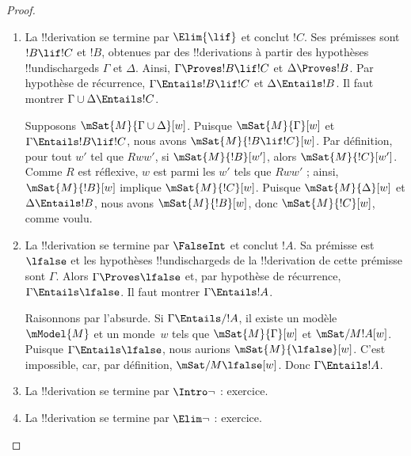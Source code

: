 \documentclass[../../../include/open-logic-section]{subfiles}
\begin{document}
\begin{proof}
\begin{enumerate}
    Supposons $\mSat{M}{\Gamma}[w]$. Nous voulons montrer que,
    pour tout $w'$ tel que $Rww'$, si $\mSat{M}{!B}[w']$, alors
    $\mSat{M}{!C}[w']$. Supposons donc $Rww'$ et
    $\mSat{M}{!B}[w']$. Par la ,
    $\mSat{M}{\Gamma}[w']$. Puisque
    $\Gamma \cup \{!B\} \Entails !C$, nous avons
    $\mSat{M}{!C}[w']$, comme voulu.

  \item La !!{derivation} se termine par $\Elim{\lif}$ et conclut
    $!C$. Ses prémisses sont $!B \lif !C$ et $!B$, obtenues par des
    !!{derivation}s à partir des hypothèses !!{undischarged}s
    $\Gamma$ et $\Delta$. Ainsi, $\Gamma \Proves !B \lif !C$ et
    $\Delta \Proves !B$. Par hypothèse de récurrence,
    $\Gamma \Entails !B \lif !C$ et $\Delta \Entails !B$.
    Il faut montrer $\Gamma \cup \Delta \Entails !C$.

    Supposons $\mSat{M}{\Gamma \cup \Delta}[w]$. Puisque
    $\mSat{M}{\Gamma}[w]$ et $\Gamma \Entails !B \lif !C$,
    nous avons $\mSat{M}{!B \lif !C}[w]$. Par définition,
    pour tout $w'$ tel que $Rww'$, si $\mSat{M}{!B}[w']$,
    alors $\mSat{M}{!C}[w']$. Comme $R$ est réflexive,
    $w$ est parmi les $w'$ tels que $Rww'$ ; ainsi,
    $\mSat{M}{!B}[w]$ implique $\mSat{M}{!C}[w]$. Puisque
    $\mSat{M}{\Delta}[w]$ et $\Delta \Entails !B$,
    nous avons $\mSat{M}{!B}[w]$, donc $\mSat{M}{!C}[w]$,
    comme voulu.

  \item La !!{derivation} se termine par $\FalseInt$ et conclut
    $!A$. Sa prémisse est $\lfalse$ et les hypothèses
    !!{undischarged}s de la !!{derivation} de cette prémisse sont
    $\Gamma$. Alors $\Gamma \Proves \lfalse$ et, par hypothèse de
    récurrence, $\Gamma \Entails \lfalse$. Il faut montrer
    $\Gamma \Entails !A$.

    Raisonnons par l'absurde. Si $\Gamma \Entails/ !A$, il existe
    un modèle~$\mModel{M}$ et un monde~$w$ tels que
    $\mSat{M}{\Gamma}[w]$ et $\mSat/{M}{!A}[w]$. Puisque
    $\Gamma \Entails \lfalse$, nous aurions
    $\mSat{M}{\lfalse}[w]$. C'est impossible, car, par définition,
    $\mSat/{M}{\lfalse}[w]$. Donc $\Gamma \Entails !A$.
  \item La !!{derivation} se termine par $\Intro\lnot$ : exercice.
  \item La !!{derivation} se termine par $\Elim\lnot$ : exercice.
  \end{enumerate}
\end{proof}
\end{document}
